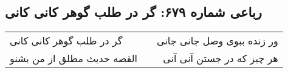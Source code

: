 \begin{center}
\section*{رباعی شماره ۶۷۹: گر در طلب گوهر کانی کانی}
\label{sec:sh679}
\begin{longtable}{l p{0.5cm} r}
گر در طلب گوهر کانی کانی
&&
ور زنده ببوی وصل جانی جانی
\\
القصه حدیث مطلق از من بشنو
&&
هر چیز که در جستن آنی آنی
\\
\end{longtable}
\end{center}
